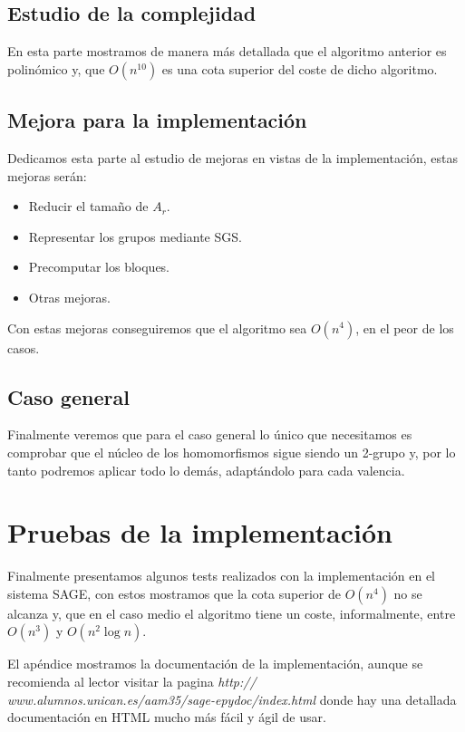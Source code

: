 \documentclass[12pt,a4paper]{book}
\theoremstyle{plain}
\theoremstyle{definition}
\theoremstyle{remark}
\begin{document}
 \subsection*{Estudio de la complejidad}
 En esta parte mostramos de manera más detallada que el algoritmo anterior es polinómico y, que $O(n^{10})$ es una 
 cota superior del coste de dicho algoritmo.
 
 \subsection*{Mejora para la implementación}
Dedicamos esta parte al  estudio de mejoras en vistas de la implementación, estas mejoras serán:
 
 \begin{itemize}
  \item Reducir el tamaño de $A_r$.
  \item Representar los grupos mediante SGS.
  \item Precomputar los bloques.
  \item Otras mejoras.
 \end{itemize}
Con estas mejoras conseguiremos que el algoritmo sea $O(n^4)$, en el peor de los casos.

\subsection*{Caso general}
Finalmente veremos que para el caso general lo único que necesitamos es comprobar que el núcleo de los homomorfismos sigue 
siendo un 2-grupo y, por lo tanto podremos aplicar todo lo demás, adaptándolo para cada valencia.

\section*{Pruebas de la implementación}
Finalmente presentamos  algunos tests realizados con la implementación en el sistema SAGE, con estos 
mostramos  que la cota  superior de $O(n^4)$  no se alcanza y,  que en el caso medio el algoritmo tiene un coste, 
informalmente,  entre  $O(n^3)$ y $O(n^2 \log n)$. 

El apéndice mostramos la documentación de la implementación, aunque se recomienda al lector  
 visitar la pagina {\it http:// www.alumnos.unican.es/aam35/sage-epydoc/index.html} donde hay una  detallada documentación 
en HTML  mucho más fácil y ágil de usar.
\nocite{*}





{}


\printindex
\end{document}
